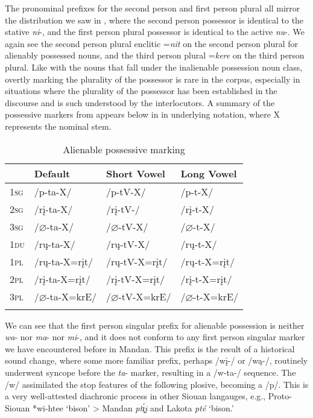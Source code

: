 The pronominal prefixes for the second person and first person plural all mirror the distribution we saw in , where the second person possessor is identical to the stative \textit{ni}-, and the first person plural possessor is identical to the active \textit{nu}-. We again see the second person plural enclitic =\textit{nit} on the second person plural for alienably possessed nouns, and the third person plural =\textit{kere} on the third person plural. Like with the nouns that fall under the inalienable possession noun class, overtly marking the plurality of the possessor is rare in the corpus, especially in situations where the plurality of the possessor has been established in the discourse and is such understood by the interlocutors. A summary of the possessive markers from  appears below in  in underlying notation, where X represents the nominal stem.

\begin{table}
    \caption{Alienable possessive marking}
    \label{TableAlienablePrefixes}
    \begin{tabular}{llll}
\lsptoprule
    ~&  \textbf{Default}&   \textbf{Short Vowel}&   \textbf{Long Vowel}\\
\midrule
    \textsc{1sg}&   /p-ta-X/&  /p-tV-X/&  /p-t-X/\\
    \textsc{2sg}&   /rį-ta-X/&  /rį-tV-/&  /rį-t-X/\\
    \textsc{3sg}&   /$\varnothing$-ta-X/&  /$\varnothing$-tV-X/&  /$\varnothing$-t-X/\\
    \textsc{1du}&   /rų-ta-X/&  /rų-tV-X/&  /rų-t-X/\\
    \textsc{1pl}&   /rų-ta-X=rįt/&  /rų-tV-X=rįt/&  /rų-t-X=rįt/\\
    \textsc{2pl}&   /rį-ta-X=rįt/&  /rį-tV-X=rįt/&  /rį-t-X=rįt/\\
    \textsc{3pl}&   /$\varnothing$-ta-X=krE/&  /$\varnothing$-tV-X=krE/&  /$\varnothing$-t-X=krE/\\
    \lspbottomrule
    \end{tabular}

\end{table}

We can see that the first person singular prefix for alienable possession is neither \textit{wa}- nor \textit{ma}- nor \textit{mi}-, and it does not conform to any first person singular marker we have encountered before in Mandan. This prefix is the result of a historical sound change, where some more familiar prefix, perhaps /wį-/ or /wą-/, routinely underwent syncope before the \textit{ta}- marker, resulting in a /w-ta-/ sequence. The /w/ assimilated the stop features of the following plosive, becoming a /p/. This is a very well-attested diachronic process in other Siouan langauges, e.g., Proto-Siouan *wi-htee `bison' > Mandan \textit{pt\'{ı̨}į} and Lakota \textit{pté} `bison.'

